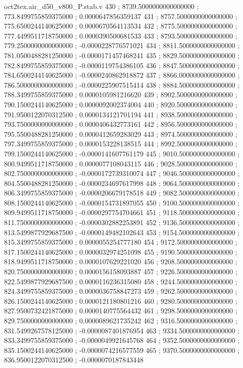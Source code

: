 \begin{filecontents}[overwrite]{oct2tex.air_d50_v800_P.stab.v}
430 ; 8739.5000000000000000 ; 773.8499755859375000 ; 0.0000647856359137
431 ; 8757.5000000000000000 ; 775.6500244140625000 ; 0.0000670564113534
432 ; 8775.5000000000000000 ; 777.4499511718750000 ; 0.0000390500681533
433 ; 8793.5000000000000000 ; 779.2500000000000000 ; -0.0000228776571021
434 ; 8811.5000000000000000 ; 781.0500488281250000 ; -0.0000171457468241
435 ; 8829.5000000000000000 ; 782.8499755859375000 ; -0.0000119754386105
436 ; 8847.5000000000000000 ; 784.6500244140625000 ; -0.0000240862918872
437 ; 8866.0000000000000000 ; 786.5000000000000000 ; -0.0000225907515414
438 ; 8884.5000000000000000 ; 788.3499755859375000 ; 0.0000105981216620
439 ; 8902.5000000000000000 ; 790.1500244140625000 ; 0.0000092002374004
440 ; 8920.5000000000000000 ; 791.9500122070312500 ; 0.0000134121701194
441 ; 8938.5000000000000000 ; 793.7500000000000000 ; 0.0000406432773161
442 ; 8956.5000000000000000 ; 795.5500488281250000 ; 0.0000412659283029
443 ; 8974.5000000000000000 ; 797.3499755859375000 ; 0.0000153228138515
444 ; 8992.5000000000000000 ; 799.1500244140625000 ; -0.0000141607761179
445 ; 9010.5000000000000000 ; 800.9499511718750000 ; 0.0000077108043115
446 ; 9028.5000000000000000 ; 802.7500000000000000 ; -0.0000172739310074
447 ; 9046.5000000000000000 ; 804.5500488281250000 ; -0.0000234697617998
448 ; 9064.5000000000000000 ; 806.3499755859375000 ; -0.0000206679178518
449 ; 9082.5000000000000000 ; 808.1500244140625000 ; -0.0000154731897055
450 ; 9100.5000000000000000 ; 809.9499511718750000 ; -0.0000297754704661
451 ; 9118.5000000000000000 ; 811.7500000000000000 ; -0.0000302882253891
452 ; 9136.5000000000000000 ; 813.5499877929687500 ; -0.0000149482102643
453 ; 9154.5000000000000000 ; 815.3499755859375000 ; 0.0000055254777180
454 ; 9172.5000000000000000 ; 817.1500244140625000 ; 0.0000032974251098
455 ; 9190.5000000000000000 ; 818.9499511718750000 ; 0.0000107629221020
456 ; 9208.5000000000000000 ; 820.7500000000000000 ; 0.0000156158093887
457 ; 9226.5000000000000000 ; 822.5499877929687500 ; 0.0000116236315080
458 ; 9244.5000000000000000 ; 824.3499755859375000 ; 0.0000036758847273
459 ; 9262.5000000000000000 ; 826.1500244140625000 ; 0.0000121180801216
460 ; 9280.5000000000000000 ; 827.9500732421875000 ; 0.0000140775564432
461 ; 9298.5000000000000000 ; 829.7500000000000000 ; 0.0000089621735242
462 ; 9316.5000000000000000 ; 831.5499267578125000 ; -0.0000087401876954
463 ; 9334.5000000000000000 ; 833.3499755859375000 ; -0.0000049921645768
464 ; 9352.5000000000000000 ; 835.1500244140625000 ; -0.0000074216577559
465 ; 9370.5000000000000000 ; 836.9500122070312500 ; -0.0000070187843448

\end{filecontents}
